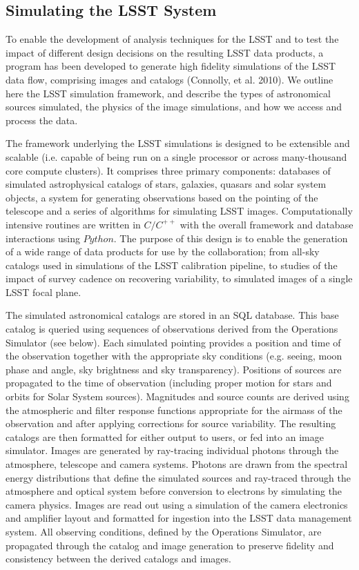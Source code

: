 \documentclass{emulateapj}
\newcommand{\B}[1]{{#1}}
\begin{document}
\B{
\vskip 0.4in
\subsection{Simulating the LSST System}

To enable the development of analysis techniques for the LSST and to test the impact of different design 
decisions on the resulting LSST data products, a program has been developed to generate high fidelity 
simulations of the LSST data flow, comprising images and catalogs (Connolly, et al. 2010). We outline here the LSST simulation 
framework, and describe the types of astronomical sources simulated, the physics of the image simulations, 
and how we access and process the data.

The framework underlying the LSST simulations is designed to be extensible and scalable (i.e. capable of 
being run on a single processor or across many-thousand core compute clusters). It comprises three primary 
components: databases of simulated astrophysical catalogs of stars, galaxies, quasars and solar system objects, 
a system for generating observations based on the pointing 
of the telescope and a series of algorithms for simulating LSST images. Computationally intensive routines are 
written in $C/C^{++}$ with the overall framework and database interactions using $Python$.  The purpose of this 
design is to enable the generation of a wide range of data products for use by the collaboration; from all-sky 
catalogs used in simulations of the LSST calibration pipeline, to studies of the impact of survey cadence on 
recovering variability, to simulated images of a single LSST focal plane.

The simulated astronomical catalogs are stored in an SQL database. This base catalog is queried using sequences 
of observations derived from the Operations Simulator (see below). Each simulated pointing provides a position 
and time of the observation together with the appropriate sky conditions (e.g. seeing, moon phase and angle,  
sky brightness and sky transparency). Positions of sources are propagated to the time of observation (including proper motion for stars 
and orbits for Solar System sources). Magnitudes and source counts are derived using the atmospheric and filter 
response functions appropriate for the airmass of the observation and after applying corrections for source variability. 
The resulting catalogs are then formatted for either output to users, 
or fed into an image simulator. Images are generated by ray-tracing individual photons through the atmosphere, 
telescope and camera systems. Photons are drawn from the spectral energy distributions that define the simulated 
sources and ray-traced through the atmosphere and optical system before conversion to electrons by simulating the 
camera physics. 
Images are read out using a simulation of the camera electronics and amplifier layout and formatted for ingestion into 
the LSST data management system. All observing conditions, defined by the Operations Simulator, are propagated 
through the catalog and image generation to preserve fidelity and consistency between the derived catalogs and images.

}
\end{document}
